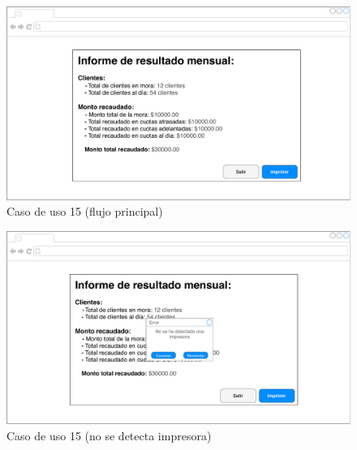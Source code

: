 \documentclass[12pt]{article}
\begin{document}
\vfill
\begin{figure}[h!]
\includegraphics[width=\textwidth]{CU15/CU-152.pdf}
\caption{Caso de uso 15 (flujo principal)}
\end{figure}
\vfill

\vfill
\begin{figure}[h!]
\includegraphics[width=\textwidth]{CU15/CU-153.pdf}
\caption{Caso de uso 15 (no se detecta impresora)}
\end{figure}
\vfill
\end{document}
